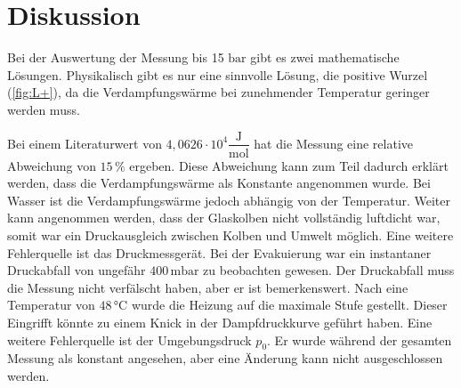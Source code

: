 \section{Diskussion}
\label{sec:Diskussion}
Bei der Auswertung der Messung bis 15 $\unit{\bar}$ gibt es zwei mathematische Lösungen. Physikalisch gibt es nur eine sinnvolle Lösung, die positive Wurzel (\autoref{fig:L+}), da die Verdampfungswärme bei zunehmender Temperatur geringer werden muss. 

Bei einem Literaturwert von ${4,0626} \cdot 10^4 \dfrac{\unit{\joule}}{\unit{\mol}}$ \cite{chemiede} hat die Messung eine relative Abweichung von $15 \,\%$ ergeben.
Diese Abweichung kann zum Teil dadurch erklärt werden, dass die Verdampfungswärme als Konstante angenommen wurde.
Bei Wasser ist die Verdampfungswärme jedoch abhängig von der Temperatur.
Weiter kann angenommen werden, dass der Glaskolben nicht vollständig luftdicht war, somit war ein Druckausgleich zwischen Kolben und Umwelt möglich.
Eine weitere Fehlerquelle ist das Druckmessgerät. Bei der Evakuierung war ein instantaner Druckabfall von ungefähr $400 \,\unit{\milli\bar}$ zu beobachten gewesen.
Der Druckabfall muss die Messung nicht verfälscht haben, aber er ist bemerkenswert.
Nach eine Temperatur von $48 \,\unit{\celsius}$ wurde die Heizung auf die maximale Stufe gestellt. Dieser Eingrifft könnte zu einem Knick in der Dampfdruckkurve geführt haben.
Eine weitere Fehlerquelle ist der Umgebungsdruck $p_0$. Er wurde während der gesamten Messung als konstant angesehen, aber eine Änderung kann nicht ausgeschlossen werden.